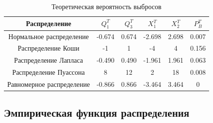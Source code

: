 \begin{table}[H]
	\begin{center}
		\begin{tabular}{|c|c|c|c|c|c|}
			\hline 
			Распределение & $Q_{1}^{T}$ & $Q_{3}^{T}$ & $X_{1}^{T}$ & $X_{2}^{T}$ & $P_{B}^{T}$ \\
			\hline\hline 
			Нормальное распределение & -0.674 & 0.674  & -2.698  & 2.698 & 0.007 \\
			\hline
			Распределение Коши & -1 & 1 &-4  &4 &0.156 \\
			\hline
			Распределение Лапласа & -0.490 & 0.490 &-1.961  &1.961 &0.063 \\
			\hline
			Распределение Пуассона & 8 & 12  & 2  & 18 & 0.008 \\
			\hline
			Равномерное распределение & -0.866 & 0.866  & -3.464  & 3.464 & 0 \\
			\hline
		\end{tabular}
	\end{center}
	\caption{Теоретическая вероятность выбросов}
\end{table}

\subsection{Эмпирическая функция распределения}

